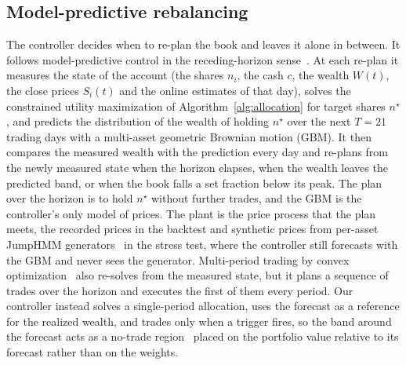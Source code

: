 
\subsection{Model-predictive rebalancing}\label{sec:method-mpc}

The controller decides when to re-plan the book and leaves it alone in between. It follows model-predictive
control in the receding-horizon sense~\cite{garcia1989mpc,mayneEtAl2000}. At each re-plan it measures the
state of the account (the shares $n_i$, the cash $c$, the wealth $W(t)$, the close prices $S_i(t)$ and the online
estimates of that day), solves the constrained utility maximization of Algorithm~\ref{alg:allocation} for target
shares $n^\star$, and predicts the distribution of the wealth of holding $n^\star$ over the next $T = 21$ trading
days with a multi-asset geometric Brownian motion (GBM). It then compares the measured wealth with the prediction
every day and re-plans from the newly measured state when the horizon elapses, when the wealth leaves the
predicted band, or when the book falls a set fraction below its peak. The plan over the horizon is to hold
$n^\star$ without further trades, and the GBM is the controller's only model of prices. The plant is the price
process that the plan meets, the recorded prices in the backtest and synthetic prices from per-asset JumpHMM
generators~\cite{alswaidan2026variance} in the stress test, where the controller still forecasts with the GBM and
never sees the generator. Multi-period trading by convex optimization~\cite{boydEtAl2017} also re-solves from
the measured state, but it plans a sequence of trades over the horizon and executes the first of them every
period. Our controller instead solves a single-period allocation, uses the forecast as a reference for the
realized wealth, and trades only when a trigger fires, so the band around the forecast acts as a no-trade
region~\cite{davisNorman1990} placed on the portfolio value relative to its forecast rather than on the weights.

